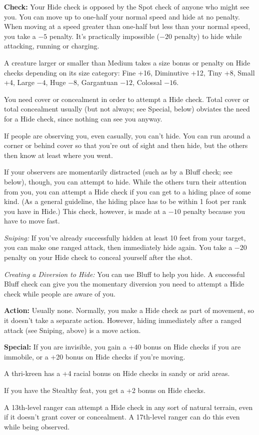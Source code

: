 \textbf{Check:} Your Hide check is opposed by the Spot check of anyone who might see you. You can move up to one-half your normal speed and hide at no penalty. When moving at a speed greater than one-half but less than your normal speed, you take a $-5$ penalty. It's practically impossible ($-20$ penalty) to hide while attacking, running or charging.

A creature larger or smaller than Medium takes a size bonus or penalty on Hide checks depending on its size category: Fine +16, Diminutive +12, Tiny +8, Small +4, Large $-4$, Huge $-8$, Gargantuan $-12$, Colossal $-16$.

You need cover or concealment in order to attempt a Hide check. Total cover or total concealment usually (but not always; see Special, below) obviates the need for a Hide check, since nothing can see you anyway.

If people are observing you, even casually, you can't hide. You can run around a corner or behind cover so that you're out of sight and then hide, but the others then know at least where you went.

If your observers are momentarily distracted (such as by a Bluff check; see below), though, you can attempt to hide. While the others turn their attention from you, you can attempt a Hide check if you can get to a hiding place of some kind. (As a general guideline, the hiding place has to be within 1 foot per rank you have in Hide.) This check, however, is made at a $-10$ penalty because you have to move fast.

\textit{Sniping:} If you've already successfully hidden at least 10 feet from your target, you can make one ranged attack, then immediately hide again. You take a $-20$ penalty on your Hide check to conceal yourself after the shot.

\textit{Creating a Diversion to Hide:} You can use Bluff to help you hide. A successful Bluff check can give you the momentary diversion you need to attempt a Hide check while people are aware of you.

\textbf{Action:} Usually none. Normally, you make a Hide check as part of movement, so it doesn't take a separate action. However, hiding immediately after a ranged attack (see Sniping, above) is a move action.

\textbf{Special:} If you are invisible, you gain a +40 bonus on Hide checks if you are immobile, or a +20 bonus on Hide checks if you're moving.

A thri-kreen has a +4 racial bonus on Hide checks in sandy or arid areas.

If you have the Stealthy feat, you get a +2 bonus on Hide checks.

A 13th-level ranger can attempt a Hide check in any sort of natural terrain, even if it doesn't grant cover or concealment. A 17th-level ranger can do this even while being observed.
